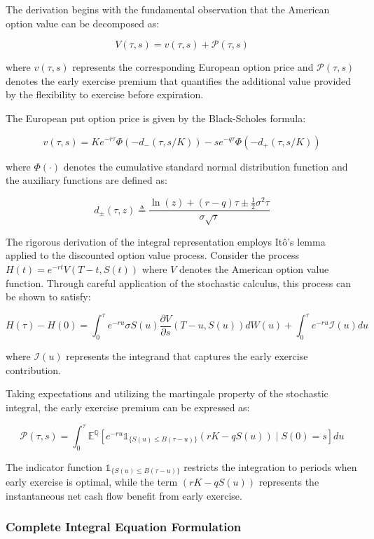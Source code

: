 \documentclass[
  11pt,
  11pt,
  letterpaper,
  onecolumn]{article}
\newcommand{\mathbbm}[1]{\mathbb{#1}}
\begin{document}
The derivation begins with the fundamental observation that the American
option value can be decomposed as:

\[V(\tau,s) = v(\tau,s) + \mathcal{P}(\tau,s) \tag{3.1}\]

where \(v(\tau,s)\) represents the corresponding European option price
and \(\mathcal{P}(\tau,s)\) denotes the early exercise premium that
quantifies the additional value provided by the flexibility to exercise
before expiration.

The European put option price is given by the Black-Scholes formula:

\[v(\tau,s) = K e^{-r\tau}\Phi(-d_-(\tau,s/K)) - s e^{-q\tau}\Phi(-d_+(\tau,s/K)) \tag{3.2}\]

where \(\Phi(\cdot)\) denotes the cumulative standard normal
distribution function and the auxiliary functions are defined as:

\[d_{\pm}(\tau,z) \triangleq \frac{\ln(z) + (r-q)\tau \pm \frac{1}{2}\sigma^2\tau}{\sigma\sqrt{\tau}} \tag{3.3}\]

The rigorous derivation of the integral representation employs Itô's
lemma applied to the discounted option value process. Consider the
process \(H(t) = e^{-rt}V(T-t, S(t))\) where \(V\) denotes the American
option value function. Through careful application of the stochastic
calculus, this process can be shown to satisfy:

\[H(\tau) - H(0) = \int_0^\tau e^{-ru} \sigma S(u) \frac{\partial V}{\partial s}(T-u, S(u)) dW(u) + \int_0^\tau e^{-ru} \mathcal{I}(u) du \tag{3.4}\]

where \(\mathcal{I}(u)\) represents the integrand that captures the
early exercise contribution.

Taking expectations and utilizing the martingale property of the
stochastic integral, the early exercise premium can be expressed as:

\[\mathcal{P}(\tau,s) = \int_0^\tau \mathbb{E}^{\mathbb{Q}}\left[e^{-ru} \mathbbm{1}_{\{S(u) \leq B(\tau-u)\}} (rK - qS(u)) \mid S(0) = s\right] du \tag{3.5}\]

The indicator function \(\mathbbm{1}_{\{S(u) \leq B(\tau-u)\}}\)
restricts the integration to periods when early exercise is optimal,
while the term \((rK - qS(u))\) represents the instantaneous net cash
flow benefit from early exercise.

\subsubsection{Complete Integral Equation
Formulation}\label{complete-integral-equation-formulation}
\end{document}
